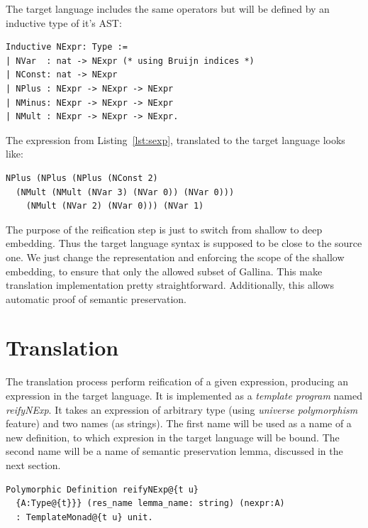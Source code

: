 \documentclass[sigplan]{acmart}\settopmatter{printfolios=true,printccs=false,printacmref=false}
\begin{document}
The target language includes the same operators but will be defined by
an inductive type of it's AST:

\begin{lstlisting}[language=Coq, mathescape=true,
  caption=Target Language type
  frame=single,basicstyle=\footnotesize]
Inductive NExpr: Type :=
| NVar  : nat -> NExpr (* using Bruijn indices *)
| NConst: nat -> NExpr
| NPlus : NExpr -> NExpr -> NExpr
| NMinus: NExpr -> NExpr -> NExpr
| NMult : NExpr -> NExpr -> NExpr.
\end{lstlisting}

The expression from Listing~\ref{lst:sexp}, translated to the target
language looks like:

\begin{lstlisting}[language=Coq, mathescape=true,
  frame=single, basicstyle=\footnotesize,
  caption=Expression in target language, label=lst:texp]
NPlus (NPlus (NPlus (NConst 2)
  (NMult (NMult (NVar 3) (NVar 0)) (NVar 0)))
    (NMult (NVar 2) (NVar 0))) (NVar 1)
\end{lstlisting}

The purpose of the reification step is just to switch from shallow to
deep embedding. Thus the target language syntax is supposed to be
close to the source one. We just change the representation and
enforcing the scope of the shallow embedding, to ensure that only the
allowed subset of Gallina. This make translation implementation pretty
straightforward. Additionally, this allows automatic proof of semantic
preservation.

\section{Translation}

The translation process perform reification of a given expression,
producing an expression in the target language. It is implemented as a
\textit{template program} named \emph{reifyNExp}. It takes an
expression of arbitrary type (using \textit{universe polymorphism}
feature) and two names (as strings). The first name will be used as a
name of a new definition, to which expresion in the target language
will be bound. The second name will be a name of semantic preservation
lemma, discussed in the next section.

\begin{lstlisting}[language=Coq, mathescape=true,
  frame=single, basicstyle=\footnotesize]
Polymorphic Definition reifyNExp@{t u}
  {A:Type@{t}}} (res_name lemma_name: string) (nexpr:A)
  : TemplateMonad@{t u} unit.
\end{lstlisting}
\end{document}
